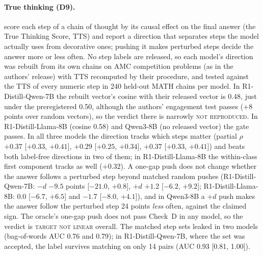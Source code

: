 \documentclass[11pt]{article}
\newcommand{\verdict}[1]{\textsc{\MakeLowercase{#1}}}
\begin{document}
\paragraph{True thinking (D9).} \citet{zhao2025truethinking} score each step of a chain of thought by its causal effect on the final answer (the True Thinking Score, TTS) and report a direction that separates steps the model actually uses from decorative ones; pushing it makes perturbed steps decide the answer more or less often. No step labels are released, so each model's direction was rebuilt from its own chains on AMC competition problems (as in the authors' release) with TTS recomputed by their procedure, and tested against the TTS of every numeric step in 240 held-out MATH chains per model. In R1-Distill-Qwen-7B the rebuilt vector's cosine with their released vector is 0.48, just under the preregistered 0.50, although the authors' engagement test passes (+8 points over random vectors), so the verdict there is narrowly \verdict{NOT REPRODUCED}. In R1-Distill-Llama-8B (cosine 0.58) and Qwen3-8B (no released vector) the gate passes. In all three models the direction tracks which steps matter (partial $\rho$ $+0.37$ [$+0.33$, $+0.41$], $+0.29$ [$+0.25$, $+0.34$], $+0.37$ [$+0.33$, $+0.41$]) and beats both label-free directions in two of them; in R1-Distill-Llama-8B the within-class first component tracks as well ($+0.32$). A one-gap push does not change whether the answer follows a perturbed step beyond matched random pushes (R1-Distill-Qwen-7B: $-d$ $-9.5$ points [$-21.0$, $+0.8$], $+d$ $+1.2$ [$-6.2$, $+9.2$]; R1-Distill-Llama-8B: $0.0$ [$-6.7$, $+6.5$] and $-1.7$ [$-8.0$, $+4.1$]), and in Qwen3-8B a $+d$ push makes the answer follow the perturbed step 24 points \emph{less} often, against the claimed sign. The oracle's one-gap push does not pass Check~D in any model, so the verdict is \verdict{TARGET NOT LINEAR} overall. The matched step sets leaked in two models (bag-of-words AUC 0.76 and 0.79); in R1-Distill-Qwen-7B, where the set was accepted, the label survives matching on only 14 pairs (AUC 0.93 [0.81, 1.00]).
\end{document}
